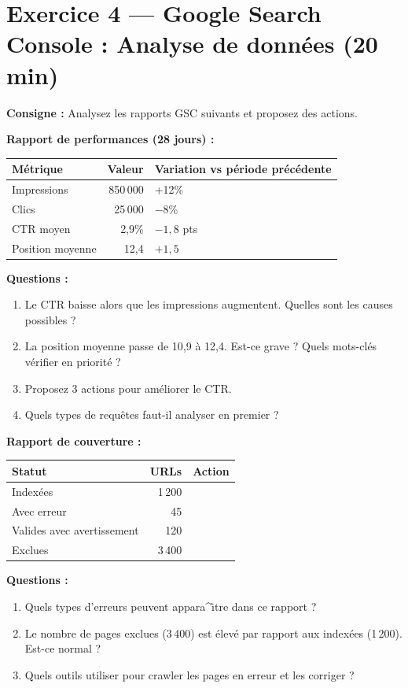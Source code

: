 \documentclass[12pt,a4paper]{report}
\begin{document}
\section{Exercice 4 --- Google Search Console : Analyse de donn\'{e}es (20 min)}

\textbf{Consigne :} Analysez les rapports GSC suivants et proposez des actions.

\textbf{Rapport de performances (28 jours) :}
\begin{longtable}{lrl}
\toprule
M\'{e}trique & Valeur & Variation vs p\'{e}riode pr\'{e}c\'{e}dente \\
\midrule
\endhead
\bottomrule
\endfoot
Impressions & 850\,000 & +12\% \\
Clics & 25\,000 & $-8$\% \\
CTR moyen & 2,9\% & $-1,8$ pts \\
Position moyenne & 12,4 & $+1,5$ \\
\bottomrule
\end{longtable}

\textbf{Questions :}
\begin{enumerate}
    \item Le CTR baisse alors que les impressions augmentent. Quelles sont les causes possibles ?
    \item La position moyenne passe de 10,9 \`{a} 12,4. Est-ce grave ? Quels mots-cl\'{e}s v\'{e}rifier en priorit\'{e} ?
    \item Proposez 3 actions pour am\'{e}liorer le CTR.
    \item Quels types de requ\^{e}tes faut-il analyser en premier ?
\end{enumerate}

\textbf{Rapport de couverture :}
\begin{longtable}{lrl}
\toprule
Statut & URLs & Action \\
\midrule
\endhead
\bottomrule
\endfoot
Index\'{e}es & 1\,200 & \\
Avec erreur & 45 & \\
Valides avec avertissement & 120 & \\
Exclues & 3\,400 & \\
\bottomrule
\end{longtable}

\textbf{Questions :}
\begin{enumerate}
    \item Quels types d'erreurs peuvent appara^{\^\i}tre dans ce rapport ?
    \item Le nombre de pages exclues (3\,400) est \'{e}lev\'{e} par rapport aux index\'{e}es (1\,200). Est-ce normal ?
    \item Quels outils utiliser pour crawler les pages en erreur et les corriger ?
\end{enumerate}
\end{document}
